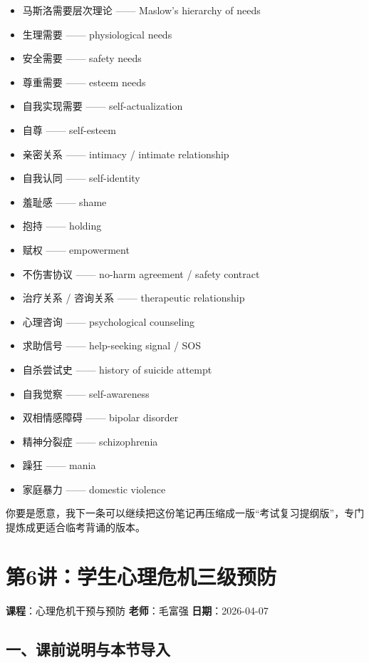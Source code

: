 \documentclass[
  chinese,
  9pt,
  a4paper,
]{ctexart}
\begin{document}
\begin{itemize}
  应对技巧 ------ coping skills
\item
  马斯洛需要层次理论 ------ Maslow's hierarchy of needs
\item
  生理需要 ------ physiological needs
\item
  安全需要 ------ safety needs
\item
  尊重需要 ------ esteem needs
\item
  自我实现需要 ------ self-actualization
\item
  自尊 ------ self-esteem
\item
  亲密关系 ------ intimacy / intimate relationship
\item
  自我认同 ------ self-identity
\item
  羞耻感 ------ shame
\item
  抱持 ------ holding
\item
  赋权 ------ empowerment
\item
  不伤害协议 ------ no-harm agreement / safety contract
\item
  治疗关系 / 咨询关系 ------ therapeutic relationship
\item
  心理咨询 ------ psychological counseling
\item
  求助信号 ------ help-seeking signal / SOS
\item
  自杀尝试史 ------ history of suicide attempt
\item
  自我觉察 ------ self-awareness
\item
  双相情感障碍 ------ bipolar disorder
\item
  精神分裂症 ------ schizophrenia
\item
  躁狂 ------ mania
\item
  家庭暴力 ------ domestic violence
\end{itemize}

你要是愿意，我下一条可以继续把这份笔记再压缩成一版``考试复习提纲版''，专门提炼成更适合临考背诵的版本。

\clearpage

\section{第6讲：学生心理危机三级预防}\label{ux7b2c6ux8bb2ux5b66ux751fux5fc3ux7406ux5371ux673aux4e09ux7ea7ux9884ux9632}

\textbf{课程}：心理危机干预与预防 \textbf{老师}：毛富强
\textbf{日期}：2026-04-07

\subsection{一、课前说明与本节导入}\label{ux4e00ux8bfeux524dux8bf4ux660eux4e0eux672cux8282ux5bfcux5165}
\end{document}
